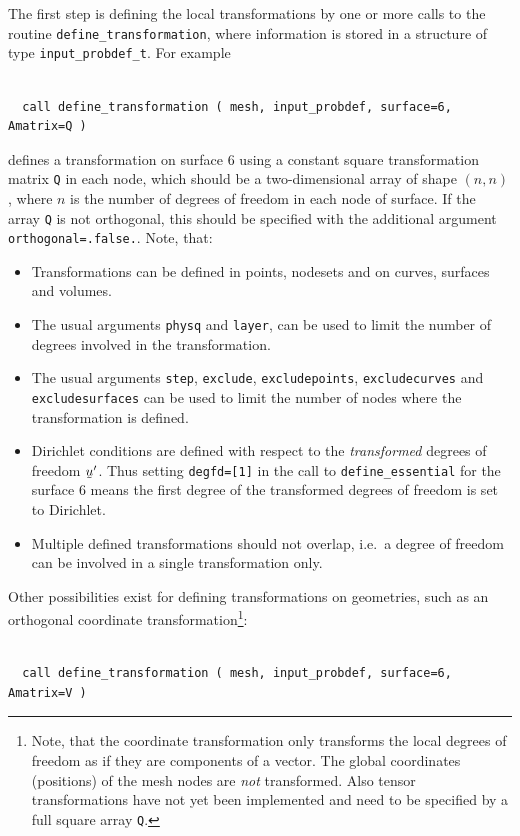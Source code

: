 The first step is defining the local transformations by one or more calls to
the routine 
\texttt{define\_transformation}, where information is stored in a structure
of type \texttt{input\_probdef\_t}. For example
\begin{verbatim}

  call define_transformation ( mesh, input_probdef, surface=6, Amatrix=Q )

\end{verbatim}
defines a transformation on surface 6 using a
constant square transformation matrix \texttt{Q} in each node, which should be a
two-dimensional array of shape $(n,n)$, where $n$ is the number of degrees
of freedom in each node of surface. If the array \texttt{Q} is not
orthogonal, this should be specified with the additional argument
\texttt{orthogonal=.false.}.
Note, that:
\begin{itemize}
  \item Transformations can be defined in points, nodesets and on curves,
        surfaces and volumes.
  \item The usual arguments \texttt{physq} and \texttt{layer},
        can be used to limit
        the number of degrees involved in the transformation.
  \item The usual arguments
        \texttt{step}, \texttt{exclude}, \texttt{excludepoints},
        \texttt{excludecurves} and\\ \texttt{excludesurfaces} can be used to limit
        the number of nodes where the transformation is defined.
  \item Dirichlet conditions are defined with respect to the \emph{transformed}
   degrees of freedom $\col u'$. Thus setting \texttt{degfd=[1]} in the call
   to \texttt{define\_essential} for the surface 6 means the first degree
   of the transformed degrees of freedom is set to Dirichlet.
   \item Multiple defined transformations should not overlap, i.e.\ a degree
   of freedom can be involved in a single transformation only.
\end{itemize}
Other possibilities exist for defining transformations on geometries, such as
an orthogonal coordinate transformation\footnote{Note, that the coordinate
transformation only transforms the local degrees of freedom as if they are
components of a vector. The global coordinates (positions) of the mesh nodes
are \emph{not} transformed. Also tensor transformations have not yet been 
implemented and need to be specified by a full square array \texttt{Q}.}:
\begin{verbatim}

  call define_transformation ( mesh, input_probdef, surface=6, Amatrix=V )

\end{verbatim}
